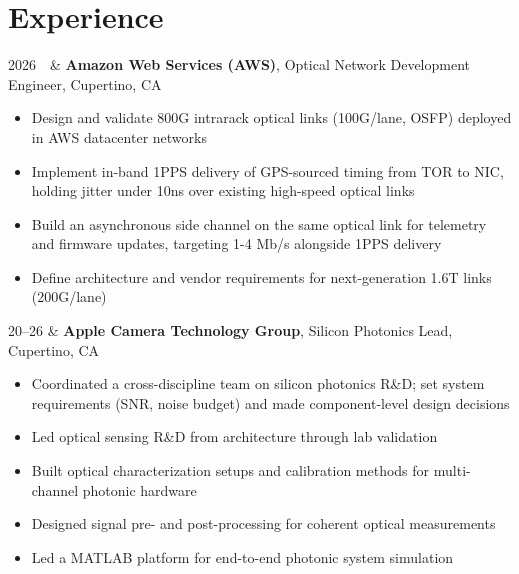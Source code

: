 \section{Experience}
\newenvironment{jobitems}{%
  \par\vspace{0.1em}%
  \begin{itemize}[nosep,leftmargin=1.15em,itemsep=0.2em]%
}{%
  \end{itemize}%
}
\begin{resumetabular}
2026 \,\, &
\textbf{Amazon Web Services (AWS)}, Optical Network Development Engineer, Cupertino, CA
\begin{jobitems}
  \item Design and validate 800G intrarack optical links (100G/lane, OSFP) deployed in AWS datacenter networks
  \item Implement in-band 1PPS delivery of GPS-sourced timing from TOR to NIC, holding jitter under 10ns over existing high-speed optical links
  \item Build an asynchronous side channel on the same optical link for telemetry and firmware updates, targeting 1-4 Mb/s alongside 1PPS delivery
  \item Define architecture and vendor requirements for next-generation 1.6T links (200G/lane)
\end{jobitems}
\end{resumetabular}

\vspace{0.3em}

\begin{resumetabular}
  20--26 &
  \textbf{Apple Camera Technology Group}, Silicon Photonics Lead, Cupertino, CA
  \begin{jobitems}
    \item Coordinated a cross-discipline team on silicon photonics R\&D; set system requirements (SNR, noise budget) and made component-level design decisions
    \item Led optical sensing R\&D from architecture through lab validation
    \item Built optical characterization setups and calibration methods for multi-channel photonic hardware
    \item Designed signal pre- and post-processing for coherent optical measurements
    \item Led a MATLAB platform for end-to-end photonic system simulation
  \end{jobitems}
  \end{resumetabular}

